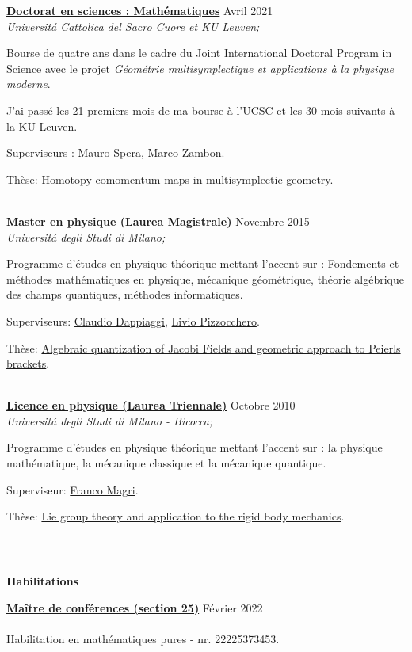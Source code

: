 \documentclass[a4paper]{article}
\newcommand{\block}[1]{\hrule \vspace{0.2cm} \textbf{\Large #1} \vspace{0.2cm}}
\newcommand{\voice}[5]{\href{#4}{\textbf{#1}} \hfill #2 \\ \textit{#3} \\ {\small #5} \vspace{0.2cm} \\}
\begin{document}
\begin{minipage}[t]{0.6\columnwidth}
    
    \voice{Doctorat en sciences : Mathématiques}
        {Avril 2021}
        {Universit\'a Cattolica del Sacro Cuore et KU Leuven;}
        {https://web.archive.org/save/http://scuoledidottorato.unicatt.it/phdschools/science-research-projects}       
        {Bourse de quatre ans dans le cadre du Joint International Doctoral Program in Science avec le projet \emph{Géométrie multisymplectique et applications à la physique moderne}. \par J'ai passé les 21 premiers mois de ma bourse à l'UCSC et les 30 mois suivants à la KU Leuven. \par Superviseurs : \href{http://docenti.unicatt.it/ita/mauro_spera/}{Mauro Spera}, \href{https://perswww.kuleuven.be/~u0096206/}{Marco Zambon}. \par Thèse: \href{https://limo.libis.be/primo-explore/fulldisplay?docid=LIRIAS3408626&context=L&vid=KULeuven&search_scope=ALL_CONTENT&tab=all_content_tab&lang=en_US}{Homotopy comomentum maps in multisymplectic geometry}. }
    \voice{Master en physique (Laurea Magistrale)}
        {Novembre 2015}
        {Universit\'a degli Studi di Milano;}
        {https://fisica-lm.cdl.unimi.it/it}       
        {Programme d'études en physique théorique mettant l'accent sur : Fondements et méthodes mathématiques en physique, mécanique géométrique, théorie algébrique des champs quantiques, méthodes informatiques. \par Superviseurs: \href{http://fisica.unipv.it/personale/Persona.php?ID=256}{Claudio Dappiaggi}, \href{http://users.mat.unimi.it/users/pizzocchero/}{Livio Pizzocchero}. \par Thèse: \href{https://www.researchgate.net/publication/295548746_Algebraic_quantization_of_Jacobi_fields_and_geometric_approach_to_Peierls_brackets}{Algebraic quantization of Jacobi Fields and geometric approach to Peierls brackets}. }
    \voice{Licence en physique (Laurea Triennale)}
        {Octobre 2010}
        {Universit\'a degli Studi di Milano - Bicocca;}
        {https://www.fisica.unimib.it/en}       
        {Programme d'études en physique théorique mettant l'accent sur : la physique mathématique, la mécanique classique et la mécanique quantique. \par Superviseur: \href{http://staff.matapp.unimib.it/~/magri/}{Franco Magri}. \par Thèse: \href{https://github.com/MasterToninus/TesiTriennale/blob/master/tesi.pdf}{Lie group theory and application to the rigid body mechanics}. }

        




    \block{Habilitations}

    
    \voice{Maître de conférences (section 25)}
        {Février 2022}
        {\vspace{-0.5cm}}
        {https://www.galaxie.enseignementsup-recherche.gouv.fr/ensup/qualification/Resultats_2022/qualifies_MCF_2022.pdf}       
        {Habilitation en mathématiques pures - nr. 22225373453.}

        



\end{minipage} 
\end{document}
